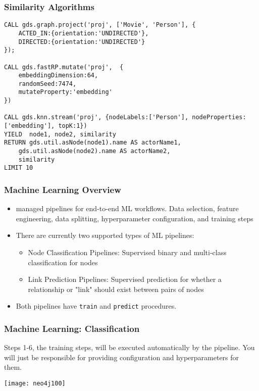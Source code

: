 \begin{frame}[fragile]\frametitle{Similarity Algorithms}

\begin{lstlisting}
CALL gds.graph.project('proj', ['Movie', 'Person'], {
    ACTED_IN:{orientation:'UNDIRECTED'},
    DIRECTED:{orientation:'UNDIRECTED'}
});

CALL gds.fastRP.mutate('proj',  {
    embeddingDimension:64,
    randomSeed:7474,
    mutateProperty:'embedding'
})

CALL gds.knn.stream('proj', {nodeLabels:['Person'], nodeProperties:['embedding'], topK:1})
YIELD  node1, node2, similarity
RETURN gds.util.asNode(node1).name AS actorName1,
    gds.util.asNode(node2).name AS actorName2,
    similarity
LIMIT 10
\end{lstlisting}
\end{frame}
\begin{frame}[fragile]\frametitle{Machine Learning Overview}

 
\begin{itemize}
\item managed pipelines for end-to-end ML workflows. Data selection, feature engineering, data splitting, hyperparameter configuration, and training steps 
\item There are currently two supported types of ML pipelines:
	\begin{itemize}
	\item Node Classification Pipelines: Supervised binary and multi-class classification for nodes
	\item Link Prediction Pipelines: Supervised prediction for whether a relationship or "link" should exist between pairs of nodes
	\end{itemize}
\item Both pipelines have \lstinline|train| and \lstinline|predict| procedures.
\end{itemize}

\end{frame}

\begin{frame}[fragile]\frametitle{Machine Learning: Classification}

Steps 1-6, the training steps, will be executed automatically by the pipeline. You will just be responsible for providing configuration and hyperparameters for them. 
 
\begin{center}
\texttt{[image: neo4j100]}
\end{center}	


\end{frame}

